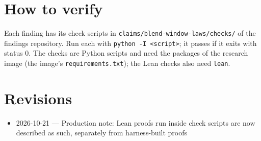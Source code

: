 \documentclass{article}
\begin{document}
\section{How to verify}

Each finding has its check scripts in \texttt{claims/blend-window-laws/checks/} of the findings repository. Run each with \texttt{python -I <script>}; it passes if it exits with status 0. The checks are Python scripts and need the packages of the research image (the image's \texttt{requirements.txt}); the Lean checks also need \texttt{lean}.

\section{Revisions}

\begin{itemize}
\item 2026-10-21 --- Production note: Lean proofs run inside check scripts are now described as such, separately from harness-built proofs
\end{itemize}



\end{document}
